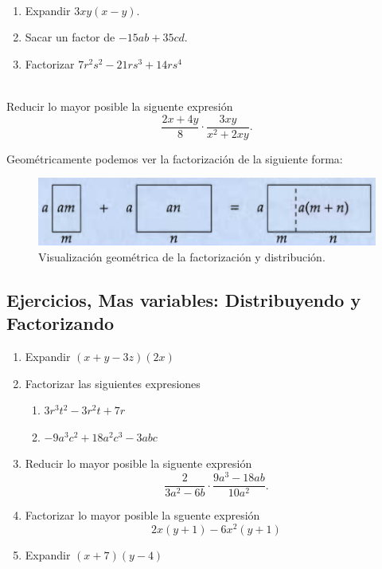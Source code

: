 \begin{ejemplo}{\ \\}
	\begin{enumerate}
		\item Expandir $3xy(x-y)$.
		\item Sacar un factor de $-15ab+35cd$.
		\item Factorizar $7r^2s^2-21rs^3+14rs^4$ 
	\end{enumerate}
\end{ejemplo}

\begin{exer}{\ \\}
	Reducir lo mayor posible la siguente expresión
	\[
	\frac{2x+4y}{8} \cdot \frac{3xy}{x^2+2xy}.
	\]
\end{exer}


Geométricamente podemos ver la factorización de la siguiente forma:
\begin{figure}[h]
	\centering
	\includegraphics[width=0.7\linewidth]{Algebra/imgs/factoratimesMN}
	\caption{Visualización geométrica de la factorización y distribución.}
	\label{fig:factoratimesMN}
\end{figure}



\newpage
\begin{center}
	\vspace{-5mm}
	\subsection*{Ejercicios, Mas variables: Distribuyendo y Factorizando}\label{ejercicios_section_distribuir_y_factorizar}
\end{center}

\begin{enumerate}
	\item Expandir $(x+y-3z)(2x)$
	
	\item Factorizar las siguientes expresiones
	\begin{multicols}{2}
		\begin{enumerate}[label=\Alph*)]
			\item $3r^3t^2-3r^2t+7r$
			\item $-9a^3c^2+18a^2c^3-3abc$			
		\end{enumerate}
	\end{multicols}
	
	
	\item Reducir lo mayor posible la siguente expresión
	\[
	\frac{2}{3a^2-6b} \cdot \frac{9a^3-18ab}{10a^2}.
	\]
	
	\item Factorizar lo mayor posible la sguente expresión
	\[
	2x(y+1) - 6x^2(y+1)
	\]
	
	\item Expandir $(x+7)(y-4)$
	
\end{enumerate}
\newpage

